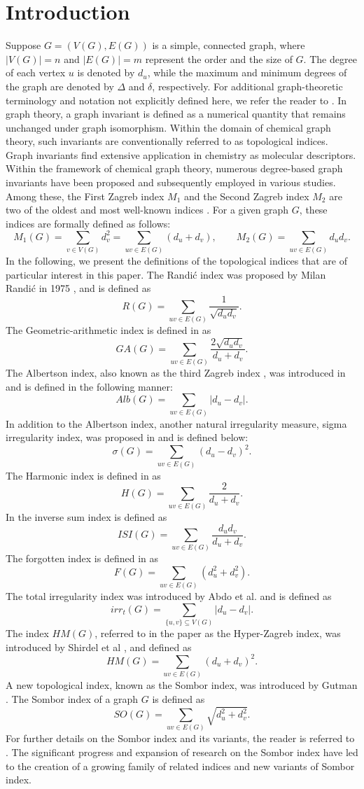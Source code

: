 \documentclass{article}
\theoremstyle{definition}
\begin{document}
\section{Introduction}
Suppose $G=(V(G),E(G))$ is a simple, connected graph, where $|V(G)|=n$ and $|E(G)|=m$ represent the order and the size of $G$. The degree of each vertex $u$ is denoted by $d_u$, while the maximum and minimum degrees of the graph are denoted by $\Delta$ and $\delta$, respectively. For additional graph-theoretic terminology and notation not explicitly defined here, we refer the reader to \cite{7, 8, 9}. In graph theory, a graph invariant is defined as a numerical quantity that remains unchanged under graph isomorphism. Within the domain of chemical graph theory, such invariants are conventionally referred to as topological indices. Graph invariants find extensive application in chemistry as molecular descriptors. Within the framework of chemical graph theory, numerous degree-based graph invariants have been proposed and subsequently employed in various studies. Among these, the First Zagreb index $M_1$ and the Second Zagreb index $M_2$ are two of the oldest and most well-known indices \cite{10, 11}. For a given graph $G$, these indices are formally defined as follows: 
\[
\displaystyle M_1(G)=\sum_{v\in V(G)} d_v^2 = \sum_{uv\in E(G)}(d_u+d_v),\qquad \displaystyle M_2(G)=\sum_{uv\in E(G)}d_u d_v.
\]
In the following, we present the definitions of the topological indices that are of particular interest in this paper.
The Randić index was proposed by Milan Randić in 1975 \cite{18}, and is defined as
\[
\displaystyle R(G)=\sum_{uv\in E(G)} \frac{1}{\sqrt{d_u d_v}}.
\]
The Geometric-arithmetic index is defined in \cite{19} as
\[
\displaystyle GA(G)=\sum_{uv\in E(G)}\frac{2\sqrt{d_ud_v}}{d_u+d_v}.
\]
The Albertson index, also known as the third Zagreb index \cite{21}, was introduced in \cite{20} and is defined in the following manner:
\[
\displaystyle Alb(G)=\sum_{uv\in E(G)}|d_u-d_v|.
\]
In addition to the Albertson index, another natural irregularity measure, sigma irregularity index, was proposed in \cite{29} and is defined below:
\[
\displaystyle \sigma(G)=\sum_{uv\in E(G)} (d_u-d_v)^2.
\]
The Harmonic index is defined in \cite{22} as
\[
\displaystyle H(G)=\sum_{uv\in E(G)}\frac{2}{d_u+d_v}.
\]
In \cite{23} the inverse sum index is defined as
\[
\displaystyle ISI(G)=\sum_{uv\in E(G)}\frac{d_u d_v}{d_u+d_v}.
\]
The forgotten index is defined in \cite{24} as
\[
\displaystyle F(G)=\sum_{uv\in E(G)}(d_u^2+d_v^2).
\]
The total irregularity index was introduced by Abdo et al. \cite{25} and is defined as
\[
\displaystyle irr_t(G)=\sum_{\{u,v\}\subseteq V(G)} |d_u-d_v|.
\]
The index $HM(G)$, referred to in the paper as the Hyper-Zagreb index, was introduced by Shirdel et al \cite{26}, and defined as
\[
\displaystyle HM(G)=\sum_{uv\in E(G)}(d_u+d_v)^2.
\]
A new topological index, known as the Sombor index, was introduced by Gutman \cite{28}. The Sombor index of a graph $G$ is defined as
\[
\displaystyle SO(G)=\sum_{uv\in E(G)}\sqrt{d_u^2+d_v^2}.
\]
For further details on the Sombor index and its variants, the reader is referred to \cite{14, 15, 16, 17}. The significant progress and expansion of research on the Sombor index have led to the creation of a growing family of related indices and new variants of Sombor index.
 
\end{document}
